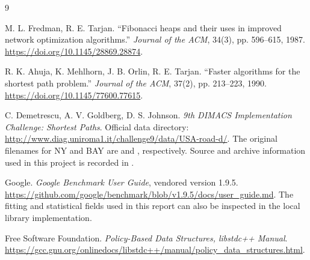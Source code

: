 \clearpage
\renewcommand{\refname}{References}
\begin{thebibliography}{9}
\raggedright
{}
M. L. Fredman, R. E. Tarjan.
``Fibonacci heaps and their uses in improved network optimization algorithms.''
\textit{Journal of the ACM}, 34(3), pp. 596--615, 1987.
\url{https://doi.org/10.1145/28869.28874}.

R. K. Ahuja, K. Mehlhorn, J. B. Orlin, R. E. Tarjan.
``Faster algorithms for the shortest path problem.''
\textit{Journal of the ACM}, 37(2), pp. 213--223, 1990.
\url{https://doi.org/10.1145/77600.77615}.

C. Demetrescu, A. V. Goldberg, D. S. Johnson.
\textit{9th DIMACS Implementation Challenge: Shortest Paths}.
Official data directory: \url{http://www.diag.uniroma1.it/challenge9/data/USA-road-d/}.
The original filenames for NY and BAY are  and
, respectively. Source and archive information used in
this project is recorded in .

Google. \textit{Google Benchmark User Guide}, vendored version 1.9.5.
\url{https://github.com/google/benchmark/blob/v1.9.5/docs/user_guide.md}.
The fitting and statistical fields used in this report can also be inspected in the
local library implementation.

Free Software Foundation. \textit{Policy-Based Data Structures, libstdc++ Manual}.
\url{https://gcc.gnu.org/onlinedocs/libstdc++/manual/policy_data_structures.html}.
\end{thebibliography}
